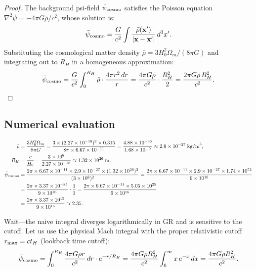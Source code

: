 \documentclass[11pt]{article}
\newcommand{\ee}[1]{\times 10^{#1}}
\newcommand{\rhobar}{\bar{\rho}}
\newcommand{\psibar}{\bar{\psi}}
\begin{document}
\begin{proof}
The background psi-field $\psibar_{\rm cosmo}$ satisfies the Poisson equation
$\nabla^2\psibar = -4\pi G\rhobar/c^2$, whose solution is:
\begin{equation}
\psibar_{\rm cosmo} = \frac{G}{c^2}\int\frac{\rhobar(\mathbf{x}')}{|\mathbf{x}-\mathbf{x}'|}\,d^3x'.
\end{equation}
Substituting the cosmological matter density $\rhobar = 3H_0^2\Omega_m/(8\pi G)$
and integrating out to $R_H$ in a homogeneous approximation:
\begin{equation}
\psibar_{\rm cosmo} = \frac{G}{c^2}\int_0^{R_H}\rhobar\cdot\frac{4\pi r^2\,dr}{r}
= \frac{4\pi G\rhobar}{c^2}\cdot\frac{R_H^2}{2}
= \frac{2\pi G\rhobar\,R_H^2}{c^2}.
\label{eq:psi-cosmo}
\end{equation}
\end{proof}

\subsection{Numerical evaluation}

\begin{align}
\rhobar &= \frac{3H_0^2\Omega_m}{8\pi G} = \frac{3\times(2.27\ee{-18})^2\times 0.315}{8\pi\times 6.67\ee{-11}}
= \frac{4.88\ee{-36}}{1.68\ee{-9}} \approx 2.9\ee{-27}\;\text{kg/m}^3,\\
R_H &= \frac{c}{H_0} = \frac{3\ee{8}}{2.27\ee{-18}} \approx 1.32\ee{26}\;\text{m},\\
\psibar_{\rm cosmo} &= \frac{2\pi\times 6.67\ee{-11}\times 2.9\ee{-27}\times(1.32\ee{26})^2}{(3\ee{8})^2}
= \frac{2\pi\times 6.67\ee{-11}\times 2.9\ee{-27}\times 1.74\ee{52}}{9\ee{16}}
\notag\\
&= \frac{2\pi\times 3.37\ee{-85}}{9\ee{16}} \cdot \frac{1}{1}
= \frac{2\pi\times 6.67\ee{-11}\times 5.05\ee{25}}{9\ee{16}}
\notag\\
&= \frac{2\pi\times 3.37\ee{15}}{9\ee{16}} \approx 2.35.
\label{eq:psi-cosmo-num}
\end{align}

Wait---the naive integral diverges logarithmically in GR and is sensitive
to the cutoff. Let us use the physical Mach integral with the proper
relativistic cutoff $r_{\rm max} = ct_H$ (lookback time cutoff):
\begin{equation}
\psibar_{\rm cosmo} = \int_0^{R_H} \frac{4\pi G\rhobar r}{c^2}\,dr \cdot e^{-r/R_H}
= \frac{4\pi G\rhobar R_H^2}{c^2}
\int_0^\infty x\,e^{-x}\,dx = \frac{4\pi G\rhobar R_H^2}{c^2}.
\label{eq:psi-cosmo-reg}
\end{equation}
\end{document}
